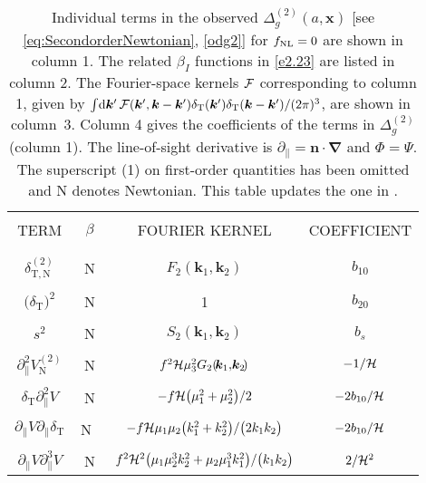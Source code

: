 \begingroup
\tiny
\begin{longtable}{| c | c | c | c |} 
\caption{ {Individual terms in the observed $\Delta_g^{(2)}(a,\bm{x})$ [see \eqref{eq:SecondorderNewtonian}, \eqref{odg2}] for $f_\text{NL}=0$ are shown in column 1. The related $\beta_I$ functions in \eqref{e2.23} are listed in column 2. The Fourier-space kernels ${\cal F}$  corresponding to column 1, given by 
$ \int \!{\mathrm{d} \bm {k}'}\, {\cal F}(\bm {k}',\bm {k}-\bm {k}')\delta_{\mathrm{T}}(\bm {k}')\delta_{\mathrm{T}}(\bm {k}-\bm {k}')/(2\pi)^3$, are shown in column~3. Column 4 gives
the coefficients of the terms in $\Delta_g^{(2)}$ (column 1). The line-of-sight derivative is $\partial_\|=\bm{n}\!\cdot\!\bm{\nabla}$ and $\Phi=\Psi$.
The superscript (1) on first-order quantities has been omitted and N denotes Newtonian. This table updates the one in \cite{Jolicoeur:2017nyt}.}} \label{tabc1} \\
\hline 
&  &  & \\
TERM & $~~\beta~~$ & FOURIER KERNEL    & COEFFICIENT \\ 
&  &  & \\ \hline \hline
&  &  & \\
$\delta^{(2)}_{\mathrm{T,{N}}}$ & N & $F_{2}(\!\bm{k}_{1},\!\bm{k}_{2}\!)$ & $b_{10}$ \\ 
&  &  & \\
${\big(\delta_{\mathrm{T}}\big)^2}$ & N & 1 & $b_{20}$ \\ 
&  &  & \\
${s^2}$ & N & $S_2(\!\bm{k}_{1},\!\bm{k}_{2}\!)$ & $b_{s}$ \\ 
&  &  & \\
$\partial_{\parallel}^{2}V^{(2)}_{{\mathrm{N}}}$ & N & $f^{2}\mathcal{H} \mu_{3}^{2}G_{2}(\!\bm{k}_{1},\!\bm{k}_{2}\!)$ & $-1/\mathcal{H}$ \\ 
&  &  & \\
$\delta_{\mathrm{T}}\partial_{\parallel}^{2}V$ & N & $-f\mathcal{H} \big(\mu_{1}^{2} + \mu_{2}^{2}\big)/2 $ & $-2b_{10}/\mathcal{H}$ \\
&  &  & \\ 
$\partial_{\parallel}V \partial_{\parallel}\delta_{\mathrm{T}}$ & N\ & $-f\mathcal{H} {{\mu_{1}\mu_{2}\big(k_{1}^{2} + k_{2}^{2}\big)}/{\big(2k_{1}k_{2}\big)}}$& $-2b_{10}/\mathcal{H}$ \\ 
&  &  & \\
$\partial_{\parallel}V \partial_{\parallel}^{3}V $  & N & $f^{2} \mathcal{H}^2{{\big(\mu_{1}\mu_{2}^{3}k_{2}^{2} + \mu_{2}\mu_{1}^{3}k_{1}^{2}\big)}/{\big(k_{1}k_{2}\big)}}$ & $ {2}/{\mathcal{H}^{2}}$  \\

\end{longtable}

